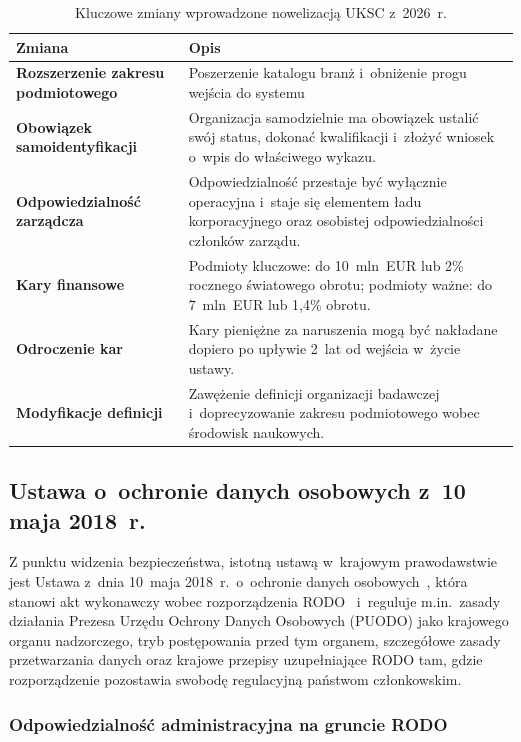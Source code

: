\begin{table}[H]
\centering
\caption{Kluczowe zmiany wprowadzone nowelizacją UKSC z~2026~r.}
\label{tab:ksc_nowelizacja}
\begin{tabular}{>{\bfseries}p{5cm} p{8.5cm}}
\hline
Zmiana & Opis \\
\hline
Rozszerzenie zakresu podmiotowego
  & Poszerzenie katalogu branż i~obniżenie progu wejścia do
    systemu \\[4pt]
Obowiązek samoidentyfikacji
  & Organizacja samodzielnie  ma obowiązek ustalić swój
    status, dokonać kwalifikacji i~złożyć wniosek o~wpis do
    właściwego wykazu. \\[4pt]
Odpowiedzialność zarządcza
  & Odpowiedzialność przestaje być wyłącznie operacyjna i~staje się
    elementem ładu korporacyjnego oraz osobistej odpowiedzialności
    członków zarządu. \\[4pt]
Kary finansowe
  & Podmioty kluczowe: do 10~mln~EUR lub 2\% rocznego światowego obrotu;
    podmioty ważne: do 7~mln~EUR lub 1,4\% obrotu. \\[4pt]
Odroczenie kar
  & Kary pieniężne za naruszenia mogą być nakładane dopiero po upływie
    2~lat od wejścia w~życie ustawy. \\[4pt]
Modyfikacje definicji
  & Zawężenie definicji organizacji badawczej i~doprecyzowanie zakresu
    podmiotowego wobec środowisk naukowych. \\
\hline
\end{tabular}
\end{table}

\subsection{Ustawa o~ochronie danych osobowych z~10 maja 2018~r.}

Z punktu widzenia bezpieczeństwa, istotną ustawą w~krajowym prawodawstwie jest Ustawa z~dnia 10~maja 2018~r.\
o~ochronie danych osobowych~\autocite{uodo2018}, która stanowi akt wykonawczy wobec rozporządzenia RODO~\autocite{rodo} i~reguluje m.in.\ zasady działania Prezesa Urzędu Ochrony Danych Osobowych (PUODO) jako krajowego organu nadzorczego, tryb postępowania przed tym organem, szczegółowe zasady przetwarzania danych oraz krajowe przepisy uzupełniające RODO tam, gdzie rozporządzenie
pozostawia swobodę regulacyjną państwom członkowskim.

\subsubsection{Odpowiedzialność administracyjna na gruncie RODO}

